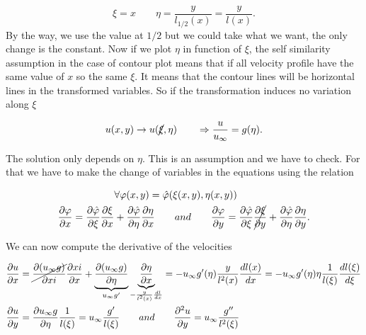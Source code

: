 		\begin{equation}
			\xi = x \qquad \eta = \frac{y}{l_{1/2}(x)} = \frac{y}{l(x)}.
			\label{eq:5.14}
		\end{equation}
		By the way, we use the value at $1/2$ but we could take what we want, the only change is the constant. Now if we plot $\eta$ in function of $\xi$, the self similarity assumption in the case of contour plot means that if all velocity profile have the same value of $x$ so the same $\xi$. It means that the contour lines will be horizontal lines in the transformed variables. So if the transformation induces no variation along $\xi$
		
		\begin{equation}
			u(x,y) \rightarrow u(\cancel{\xi} , \eta ) \qquad \Rightarrow \frac{u}{u_\infty} = g(\eta).
		\end{equation}
		
		The solution only depends on $\eta$. This is an assumption and we have to check. For that we have to make the change of variables in the equations using the relation 
		
		\begin{equation}
		\begin{aligned}
		&\forall \varphi (x,y) = \hat{\varphi}(\xi (x,y), \eta (x,y)) \\
			\frac{\partial \varphi}{\partial x} = \frac{\partial \hat{\varphi}}{\partial \xi} 	\frac{\partial \xi}{\partial x} &+ \frac{\partial \hat{\varphi}}{\partial \eta} \frac{\partial \eta}{\partial x} \qquad and \qquad
			\frac{\partial \varphi}{\partial y} = \frac{\partial \hat{\varphi}}{\partial \xi} \cancel{\frac{\partial \xi}{\partial y}} + \frac{\partial \hat{\varphi}}{\partial \eta} \frac{\partial \eta}{\partial y}.
		\end{aligned}
		\end{equation}
		
		We can now compute the derivative of the velocities
		
		\begin{equation}
		\begin{aligned}
			&\frac{\partial u}{\partial x} = \cancel{\frac{\partial (u_\infty g)}{\partial xi}} \frac{\partial xi}{\partial x} + \underbrace{\frac{\partial (u_\infty g)}{\partial \eta}}_{u_\infty g'} \underbrace{\frac{\partial \eta}{\partial x}}_{-\frac{y}{l^2(x)}\frac{dl}{dx}} = - u_\infty g'(\eta)\frac{y}{l^2(x)}\frac{dl(x)}{dx} = - u_\infty g'(\eta)\eta \frac{1}{l(\xi)} \frac{dl(\xi)}{d\xi}\\
			&\frac{\partial u}{\partial y} = \frac{\partial u_\infty g}{\partial \eta} \frac{1}{l(\xi)} = u_\infty \frac{g'}{l(\xi)} \qquad and \qquad \frac{\partial ^2 u}{\partial y }= u_\infty \frac{g''}{l^2(\xi)}
		\end{aligned}
		\label{eq:5.17}
		\end{equation}
		
